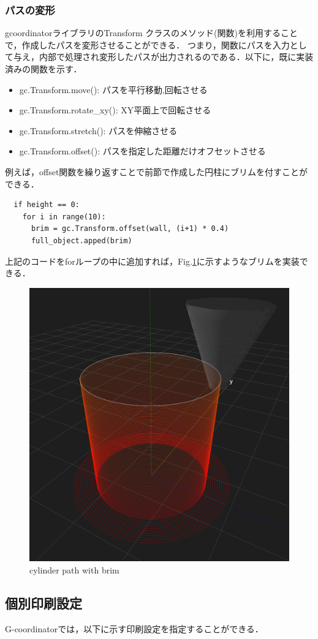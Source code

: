 \documentclass{article}
\begin{document}
\begin{twocolumn}
\subsubsection{パスの変形}
gcoordinatorライブラリのTransform クラスのメソッド(関数)を利用することで，作成したパスを変形させることができる．
つまり，関数にパスを入力として与え，内部で処理され変形したパスが出力されるのである．以下に，既に実装済みの関数を示す．
\begin{itemize}
  \item gc.Transform.move(): パスを平行移動,回転させる
  \item gc.Transform.rotate\_xy(): XY平面上で回転させる
  \item gc.Transform.stretch(): パスを伸縮させる
  \item gc.Transform.offset():  パスを指定した距離だけオフセットさせる
\end{itemize}
例えば，offset関数を繰り返すことで前節で作成した円柱にブリムを付すことができる．
\begin{lstlisting}
  if height == 0:
    for i in range(10):
      brim = gc.Transform.offset(wall, (i+1) * 0.4)
      full_object.apped(brim)
\end{lstlisting}
上記のコードをforループの中に追加すれば，Fig.\ref{fig:cylinderbrim}に示すようなブリムを実装できる．
\begin{figure}[h]
  \centering
  \includegraphics[width=0.6\linewidth]{img/cylinder_brim.png}
  \caption{cylinder path with brim}
  \label{fig:cylinderbrim}
\end{figure}


\subsection{個別印刷設定} 
\label{sec:IndividualSettings}
G-coordinatorでは，以下に示す印刷設定を指定することができる．


\end{twocolumn}
\end{document}
